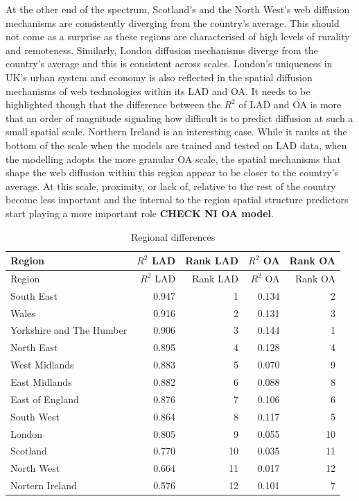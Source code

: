 \documentclass[
  authoryear,
  preprint,
  3p]{elsarticle}
\begin{document}
At the other end of the spectrum, Scotland's and the North West's web
diffusion mechanisms are consistently diverging from the country's
average. This should not come as a surprise as these regions are
characterised of high levels of rurality and remoteness. Similarly,
London diffusion mechanisms diverge from the country's average and this
is consistent across scales. London's uniqueness in UK's urban system
and economy is also reflected in the spatial diffusion mechanisms of web
technologies within its LAD and OA. It needs to be highlighted though
that the difference between the \(R^2\) of LAD and OA is more that an
order of magnitude signaling how difficult is to predict diffusion at
such a small spatial scale. Northern Ireland is an interesting case.
While it ranks at the bottom of the scale when the models are trained
and tested on LAD data, when the modelling adopts the more granular OA
scale, the spatial mechanisms that shape the web diffusion within this
region appear to be closer to the country's average. At this scale,
proximity, or lack of, relative to the rest of the country become less
important and the internal to the region spatial structure predictors
start playing a more important role \textbf{CHECK NI OA model}.

\begin{longtable}[]{@{}lrrrr@{}}
\caption{Regional differences\label{table.regions}}\tabularnewline
\toprule\noalign{}
Region & \(R^2\) LAD & Rank LAD & \(R^2\) OA & Rank OA \\
\midrule\noalign{}
\endfirsthead
\toprule\noalign{}
Region & \(R^2\) LAD & Rank LAD & \(R^2\) OA & Rank OA \\
\midrule\noalign{}
\endhead
\bottomrule\noalign{}
\endlastfoot
South East & 0.947 & 1 & 0.134 & 2 \\
Wales & 0.916 & 2 & 0.131 & 3 \\
Yorkshire and The Humber & 0.906 & 3 & 0.144 & 1 \\
North East & 0.895 & 4 & 0.128 & 4 \\
West Midlands & 0.883 & 5 & 0.070 & 9 \\
East Midlands & 0.882 & 6 & 0.088 & 8 \\
East of England & 0.876 & 7 & 0.106 & 6 \\
South West & 0.864 & 8 & 0.117 & 5 \\
London & 0.805 & 9 & 0.055 & 10 \\
Scotland & 0.770 & 10 & 0.035 & 11 \\
North West & 0.664 & 11 & 0.017 & 12 \\
Nortern Ireland & 0.576 & 12 & 0.101 & 7 \\
\end{longtable}
\end{document}
